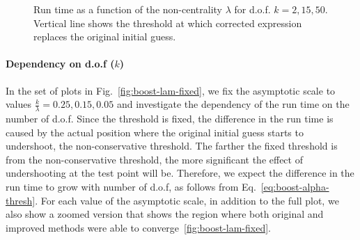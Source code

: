 \documentclass[final,5p,twocolumn,times,authoryear]{elsarticle}
\begin{document}
\begin{figure}[h]
\begin{subfigure}[t]{0.35\textwidth}
		\caption{}
	\end{subfigure}
	\caption{Run time as a function of the non-centrality $\lambda$ for d.o.f. $k=2,15,50$. Vertical line shows the threshold at which corrected expression replaces the original initial guess.}\label{fig:boost-k-fixed}
\end{figure}
%
\paragraph{Dependency on d.o.f ($k$)} In the set of plots in Fig.~\ref{fig:boost-lam-fixed}, we fix the asymptotic scale to values $\frac{k}{\lambda} = 0.25, 0.15, 0.05$ and investigate the dependency of the run time on the number of d.o.f. Since the threshold is fixed, the difference in the run time is caused by the actual position where the original initial guess starts to undershoot, the non-conservative threshold. The farther the fixed threshold is from the non-conservative threshold, the more significant the effect of undershooting at the test point will be. Therefore, we expect the difference in the run time to grow with number of d.o.f, as follows from Eq.~\ref{eq:boost-alpha-thresh}. For each value of the asymptotic scale, in addition to the full plot, we also show a zoomed version that shows the region where both original and improved methods were able to converge~\ref{fig:boost-lam-fixed}.
%
\end{document}
